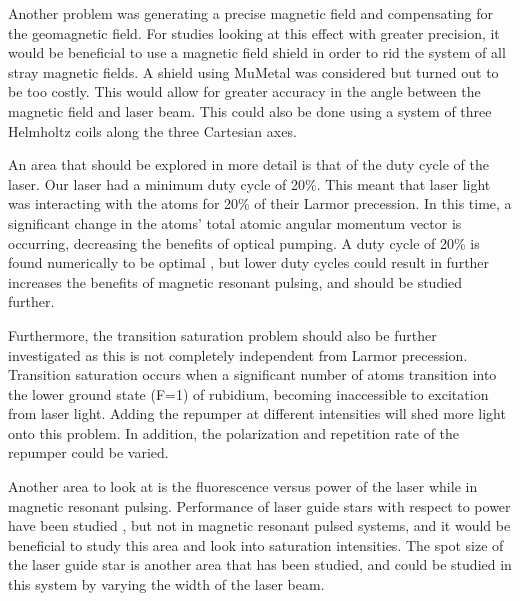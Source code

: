 Another problem was generating a precise magnetic field and compensating for the geomagnetic field. For studies looking at this effect with greater precision, it would be beneficial to use a magnetic field shield in order to rid the system of all stray magnetic fields. A shield using MuMetal was considered but turned out to be too costly. This would allow for greater accuracy in the angle between the magnetic field and laser beam. This could also be done using a system of three Helmholtz coils along the three Cartesian axes.

An area that should be explored in more detail is that of the duty cycle of the laser. Our laser had a minimum duty cycle of 20\%. This meant that laser light was interacting with the atoms for 20\% of their Larmor precession. In this time, a significant change in the atoms' total atomic angular momentum vector is occurring, decreasing the benefits of optical pumping. A duty cycle of 20\% is found numerically to be optimal \cite{Rampy2010}, but lower duty cycles could result in further increases the benefits of magnetic resonant pulsing, and should be studied further.

Furthermore, the transition saturation problem should also be further investigated as this is not completely independent from Larmor precession. Transition saturation occurs when a significant number of atoms transition into the lower ground state (F=1) of rubidium, becoming inaccessible to excitation from laser light. Adding the repumper at different intensities will shed more light onto this problem. In addition, the polarization and repetition rate of the repumper could be varied.

Another area to look at is the fluorescence versus power of the laser while in magnetic resonant pulsing. Performance of laser guide stars with respect to power have been studied \cite{Holzlohner2012}, but not in magnetic resonant pulsed systems, and it would be beneficial to study this area and look into saturation intensities. The spot size of the laser guide star is another area that has been studied, \cite{Holzlohner2012} and could be studied in this system by varying the width of the laser beam.
